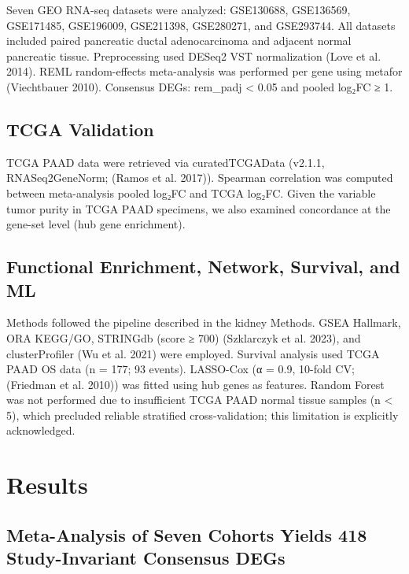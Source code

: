 \documentclass[
  12pt,
]{article}
\begin{document}
Seven GEO RNA-seq datasets were analyzed: GSE130688, GSE136569,
GSE171485, GSE196009, GSE211398, GSE280271, and GSE293744. All datasets
included paired pancreatic ductal adenocarcinoma and adjacent normal
pancreatic tissue. Preprocessing used DESeq2 VST normalization (Love et
al. 2014). REML random-effects meta-analysis was performed per gene
using metafor (Viechtbauer 2010). Consensus DEGs: rem\_padj \textless{}
0.05 and \textbar pooled log₂FC\textbar{} ≥ 1.

\subsection{TCGA Validation}\label{tcga-validation}

TCGA PAAD data were retrieved via curatedTCGAData (v2.1.1,
RNASeq2GeneNorm; (Ramos et al. 2017)). Spearman correlation was computed
between meta-analysis pooled log₂FC and TCGA log₂FC. Given the variable
tumor purity in TCGA PAAD specimens, we also examined concordance at the
gene-set level (hub gene enrichment).

\subsection{Functional Enrichment, Network, Survival, and
ML}\label{functional-enrichment-network-survival-and-ml}

Methods followed the pipeline described in the kidney Methods. GSEA
Hallmark, ORA KEGG/GO, STRINGdb (score ≥ 700) (Szklarczyk et al. 2023),
and clusterProfiler (Wu et al. 2021) were employed. Survival analysis
used TCGA PAAD OS data (n = 177; 93 events). LASSO-Cox (α = 0.9, 10-fold
CV; (Friedman et al. 2010)) was fitted using hub genes as features.
Random Forest was not performed due to insufficient TCGA PAAD normal
tissue samples (n \textless{} 5), which precluded reliable stratified
cross-validation; this limitation is explicitly acknowledged.

\section{Results}\label{results}

\subsection{Meta-Analysis of Seven Cohorts Yields 418 Study-Invariant
Consensus
DEGs}\label{meta-analysis-of-seven-cohorts-yields-418-study-invariant-consensus-degs}
\end{document}
